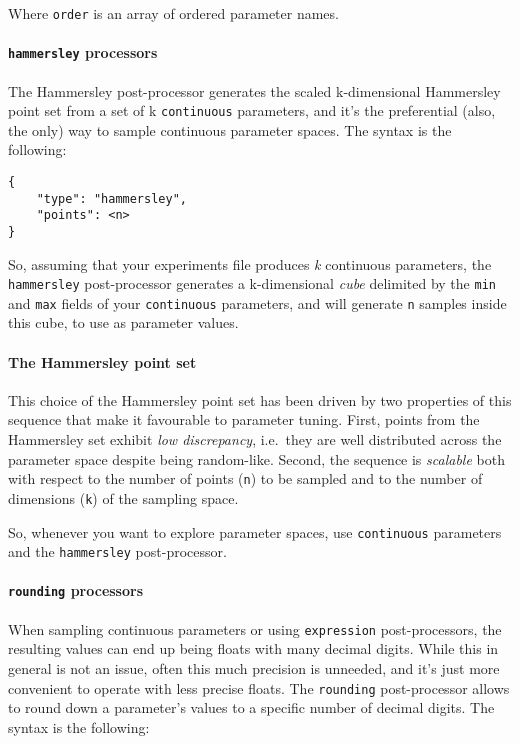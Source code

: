 \documentclass[11pt,notitlepage,twoside,a4paper]{article}
\begin{document}
\noindent
Where \texttt{order} is an array of ordered parameter names.

\paragraph{\texttt{hammersley} processors}

The Hammersley post-processor generates the scaled k-dimensional
Hammersley point set from a set of k \texttt{continuous} parameters, and
it's the preferential (also, the only) way to sample continuous
parameter spaces. The syntax is the following:

\begin{lstlisting}
{
    "type": "hammersley",
    "points": <n>
}
\end{lstlisting}

So, assuming that your experiments file produces \emph{k} continuous
parameters, the \texttt{hammersley} post-processor generates a
k-dimensional \emph{cube} delimited by the \texttt{min} and \texttt{max}
fields of your \texttt{continuous} parameters, and will generate
\texttt{n} samples inside this cube, to use as parameter values.

\paragraph{The Hammersley point set} This choice of the Hammersley point set has been driven by two
properties of this sequence that make it favourable to parameter tuning.
First, points from the Hammersley set exhibit \emph{low discrepancy},
i.e.~they are well distributed across the parameter space despite being
random-like. Second, the sequence is \emph{scalable} both with respect
to the number of points (\texttt{n}) to be sampled and to the number of
dimensions (\texttt{k}) of the sampling space.

So, whenever you want to explore parameter spaces, use
\texttt{continuous} parameters and the \texttt{hammersley}
post-processor.

\paragraph{\texttt{rounding} processors}

When sampling continuous parameters or using \texttt{expression}
post-processors, the resulting values can end up being floats with many
decimal digits. While this in general is not an issue, often this much
precision is unneeded, and it's just more convenient to operate with
less precise floats. The \texttt{rounding} post-processor allows to
round down a parameter's values to a specific number of decimal digits.
The syntax is the following:
\end{document}
